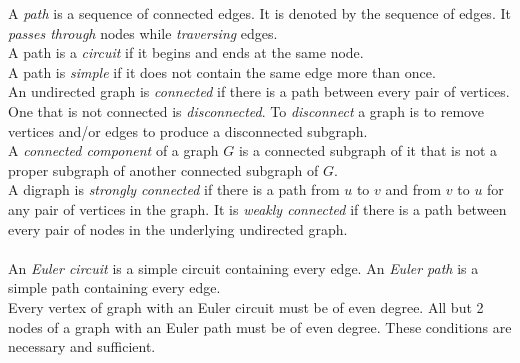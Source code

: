\documentclass[12pt, A4, twocolumn]{article}
\begin{document}
		A \textit{path} is a sequence of connected edges. It is denoted by the sequence of edges. It \textit{passes through} nodes while \textit{traversing} edges. \\
		A path is a \textit{circuit} if it begins and ends at the same node. \\
		A path is \textit{simple} if it does not contain the same edge more than once. \\
		An undirected graph is \textit{connected} if there is a path between every pair of vertices. One that is not connected is \textit{disconnected}. To \textit{disconnect} a graph is to remove vertices and/or edges to produce a disconnected subgraph. \\
		A \textit{connected component} of a graph \(G\) is a connected subgraph of it that is not a proper subgraph of another connected subgraph of \(G\). \\
		A digraph is \textit{strongly connected} if there is a path from \(u\) to \(v\) and from \(v\) to \(u\) for any pair of vertices in the graph. It is \textit{weakly connected} if there is a path between every pair of nodes in the underlying undirected graph. \\\\
		An \textit{Euler circuit} is a simple circuit containing every edge. An \textit{Euler path} is  a simple path containing every edge. \\
		Every vertex of graph with an Euler circuit must be of even degree. All but 2 nodes of a graph with an Euler path must be of even degree. These conditions are necessary and sufficient. \\
		
\end{document}
